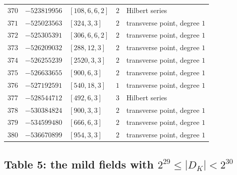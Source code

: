\documentclass[11pt]{article}
\begin{document}
\begin{center}
\begin{longtable}{r r l c l}
$370$ & $-523819956$ & $[108,6,6,2]$ & $2$ & Hilbert series\\
$371$ & $-525023563$ & $[324,3,3]$ & $2$ & transverse point, degree $1$\\
$372$ & $-525305391$ & $[306,6,6,2]$ & $2$ & transverse point, degree $1$\\
$373$ & $-526209032$ & $[288,12,3]$ & $2$ & transverse point, degree $1$\\
$374$ & $-526255239$ & $[2520,3,3]$ & $2$ & transverse point, degree $1$\\
$375$ & $-526633655$ & $[900,6,3]$ & $2$ & transverse point, degree $1$\\
$376$ & $-527192591$ & $[540,18,3]$ & $1$ & transverse point, degree $1$\\
$377$ & $-528544712$ & $[492,6,3]$ & $3$ & Hilbert series\\
$378$ & $-530384824$ & $[900,3,3]$ & $2$ & transverse point, degree $1$\\
$379$ & $-534599480$ & $[666,6,3]$ & $2$ & transverse point, degree $1$\\
$380$ & $-536670899$ & $[954,3,3]$ & $2$ & transverse point, degree $1$\\
\end{longtable}
\end{center}

\subsection*{Table 5: the mild fields with $2^{29}\le|D_K|<2^{30}$}
\end{document}
